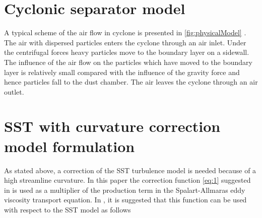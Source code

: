 \documentclass[a4paper]{jpconf}
\begin{document}
\section{Cyclonic separator model}
A typical scheme of the air flow in cyclone is presented in \cref{fig:physicalModel} \cite{instructions}. The air with dispersed particles enters the cyclone through an air inlet. Under the centrifugal forces heavy particles move to the boundary layer on a sidewall. The influence of the air flow on the particles which have moved to the boundary layer is relatively small compared with the influence of the gravity force and hence particles fall to the dust chamber. The air leaves the cyclone through an air outlet.
\section{SST with curvature correction model formulation}
\label{sec:model}
As stated above, a correction of the SST turbulence model is needed because of a high streamline curvature. In this paper the correction function \eqref{eq:1} suggested in \cite{ShurSpallart} is used as a multiplier of the production term in the Spalart-Allmaras eddy viscosity transport equation. In \cite{Smirnov}, it is suggested that this function can be used with respect to the SST model as follows
\end{document}
